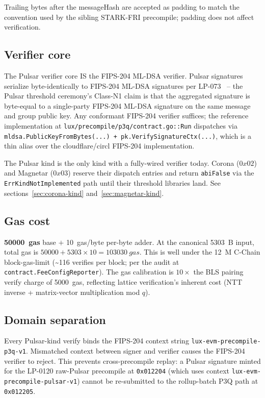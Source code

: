 Trailing bytes after the messageHash are accepted as padding to
match the convention used by the sibling STARK-FRI precompile;
padding does not affect verification.

\subsection{Verifier core}

The Pulsar verifier core IS the FIPS-204 ML-DSA verifier. Pulsar
signatures serialize byte-identically to FIPS-204 ML-DSA
signatures per LP-073~\cite{lp073} -- the Pulsar threshold
ceremony's Class-N1 claim is that the aggregated signature is
byte-equal to a single-party FIPS-204 ML-DSA signature on the
same message and group public key. Any conformant FIPS-204
verifier suffices; the reference implementation at
\texttt{lux/precompile/p3q/contract.go::Run} dispatches via
\texttt{mldsa.PublicKeyFromBytes(...) + pk.VerifySignatureCtx(...)},
which is a thin alias over the cloudflare/circl FIPS-204
implementation.

The Pulsar kind is the only kind with a fully-wired verifier
today. Corona ($0x02$) and Magnetar ($0x03$) reserve their
dispatch entries and return \texttt{abiFalse} via the
\texttt{ErrKindNotImplemented} path until their threshold
libraries land. See sections~\ref{sec:corona-kind}
and~\ref{sec:magnetar-kind}.

\subsection{Gas cost}

\textbf{\SI{50000}{gas}} base $+$ \SI{10}{gas/byte} per-byte
adder. At the canonical \SI{5303}{B} input, total gas is
$50000 + 5303 \times 10 = \SI{103030}{gas}$. This is well under
the \SI{12}{M} C-Chain block-gas-limit (\textasciitilde 116
verifies per block; per the audit at
\texttt{contract.FeeConfigReporter}). The gas calibration is
$10\times$ the BLS pairing verify charge of \SI{5000}{gas},
reflecting lattice verification's inherent cost (NTT inverse +
matrix-vector multiplication mod $q$).

\subsection{Domain separation}

Every Pulsar-kind verify binds the FIPS-204 context string
\texttt{lux-evm-precompile-p3q-v1}. Mismatched context between
signer and verifier causes the FIPS-204 verifier to reject. This
prevents cross-precompile replay: a Pulsar signature minted for
the LP-0120 raw-Pulsar precompile at \texttt{0x012204} (which
uses context \texttt{lux-evm-precompile-pulsar-v1}) cannot be
re-submitted to the rollup-batch P3Q path at \texttt{0x012205}.

